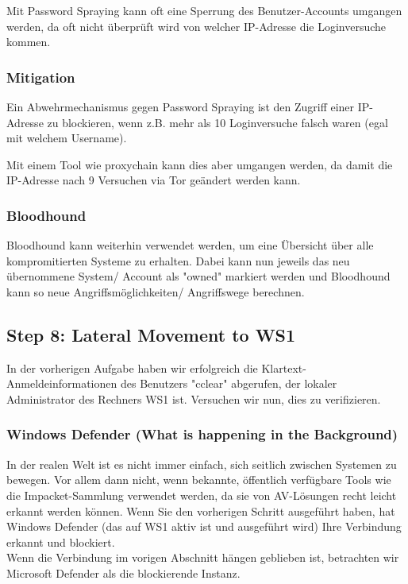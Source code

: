Mit Password Spraying kann oft eine Sperrung des Benutzer-Accounts umgangen werden, da oft nicht überprüft wird von welcher IP-Adresse die Loginversuche kommen.

\subsubsection{Mitigation}
Ein Abwehrmechanismus gegen Password Spraying ist den Zugriff einer IP-Adresse zu blockieren, wenn z.B. mehr als 10 Loginversuche falsch waren (egal mit welchem Username).

Mit einem Tool wie proxychain kann dies aber umgangen werden, da damit die IP-Adresse nach 9 Versuchen via Tor geändert werden kann.

\subsubsection{Bloodhound}
Bloodhound kann weiterhin verwendet werden, um eine Übersicht über alle kompromitierten Systeme zu erhalten. Dabei kann nun jeweils das neu übernommene System/ Account als "owned" markiert werden und Bloodhound kann so neue Angriffsmöglichkeiten/ Angriffswege berechnen.

\newpage

\subsection{Step 8: Lateral Movement to WS1}
In der vorherigen Aufgabe haben wir erfolgreich die Klartext-Anmeldeinformationen des Benutzers "cclear" abgerufen, der lokaler Administrator des Rechners WS1 ist. Versuchen wir nun, dies zu verifizieren.

\subsubsection{Windows Defender (What is happening in the Background)}
In der realen Welt ist es nicht immer einfach, sich seitlich zwischen Systemen zu bewegen. Vor allem dann nicht, wenn bekannte, öffentlich verfügbare Tools wie die Impacket-Sammlung verwendet werden, da sie von AV-Lösungen recht leicht erkannt werden können. Wenn Sie den vorherigen Schritt ausgeführt haben, hat Windows Defender (das auf WS1 aktiv ist und ausgeführt wird) Ihre Verbindung erkannt und blockiert.\\

Wenn die Verbindung im vorigen Abschnitt hängen geblieben ist, betrachten wir Microsoft Defender als die blockierende Instanz.

